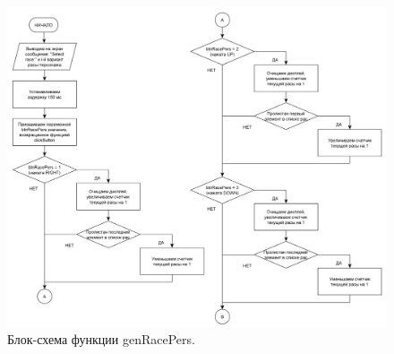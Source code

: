 \begin{figure}[H]
    \centering
    \includegraphics[scale=0.75]{genRacePers1.png}
    \caption{Блок-схема функции genRacePers.}
    \label{fig:race1}
\end{figure}


